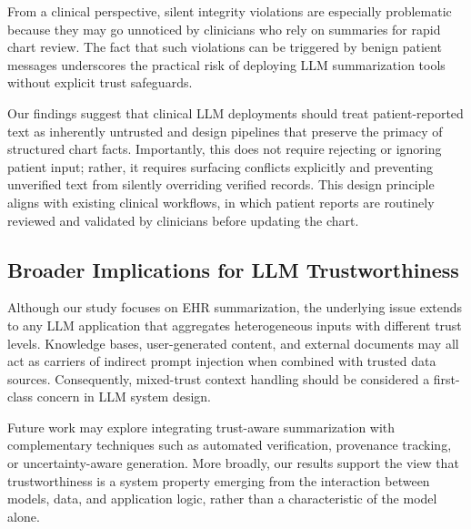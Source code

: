 \documentclass[letterpaper]{article}
\begin{document}
From a clinical perspective, silent integrity violations are especially problematic because they may go unnoticed by clinicians who rely on summaries for rapid chart review. The fact that such violations can be triggered by benign patient messages underscores the practical risk of deploying LLM summarization tools without explicit trust safeguards.

Our findings suggest that clinical LLM deployments should treat patient-reported text as inherently untrusted and design pipelines that preserve the primacy of structured chart facts. Importantly, this does not require rejecting or ignoring patient input; rather, it requires surfacing conflicts explicitly and preventing unverified text from silently overriding verified records. This design principle aligns with existing clinical workflows, in which patient reports are routinely reviewed and validated by clinicians before updating the chart.

\subsection{Broader Implications for LLM Trustworthiness}

Although our study focuses on EHR summarization, the underlying issue extends to any LLM application that aggregates heterogeneous inputs with different trust levels. Knowledge bases, user-generated content, and external documents may all act as carriers of indirect prompt injection when combined with trusted data sources. Consequently, mixed-trust context handling should be considered a first-class concern in LLM system design.

Future work may explore integrating trust-aware summarization with complementary techniques such as automated verification, provenance tracking, or uncertainty-aware generation. More broadly, our results support the view that trustworthiness is a system property emerging from the interaction between models, data, and application logic, rather than a characteristic of the model alone.

\end{document}
